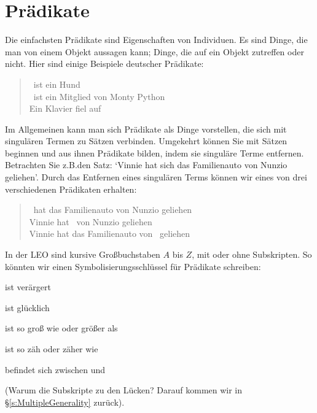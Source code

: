 \section{Prädikate}
Die einfachsten Prädikate sind Eigenschaften von Individuen. Es sind Dinge, die man von einem Objekt aussagen kann; Dinge, die auf ein Objekt zutreffen oder nicht. Hier sind einige Beispiele deutscher Prädikate:
	\begin{quote}
		\blank\ ist ein Hund\\
		\blank\ ist ein Mitglied von Monty Python\\
		Ein Klavier fiel auf \blank
	\end{quote}
Im Allgemeinen kann man sich Prädikate als Dinge vorstellen, die sich mit singulären Termen zu Sätzen verbinden. Umgekehrt können Sie mit Sätzen beginnen und aus ihnen Prädikate bilden, indem sie singuläre Terme entfernen. Betrachten Sie z.B.\@ den Satz: `Vinnie hat sich das Familienauto von Nunzio geliehen'. Durch das Entfernen eines singulären Terms können wir eines von drei verschiedenen Prädikaten erhalten:
	\begin{quote}
		\blank\ hat das Familienauto von Nunzio geliehen\\
		Vinnie hat \blank\ von Nunzio geliehen\\
		Vinnie hat das Familienauto von \blank\ geliehen
	\end{quote}
In der LEO sind  kursive Gro{\ss}buchstaben $A$ bis $Z$, mit oder ohne Subskripten. So könnten wir einen Symbolisierungsschlüssel für Prädikate schreiben:
	\begin{ekey}
		\item[\atom{A}{x}]  ist verärgert
		\item[\atom{G}{x}]  ist glücklich
		\item[\atom{G_1}{x,y}]  ist so gro{\ss} wie oder grö{\ss}er als 
		\item[\atom{Z}{x,y}]  ist so zäh oder zäher wie 
		\item[\atom{Z_2}{x,y,z}]  befindet sich zwischen  und 
	\end{ekey}
        (Warum die Subskripte zu den Lücken? Darauf kommen wir in \S\ref{s:MultipleGenerality} zurück).


